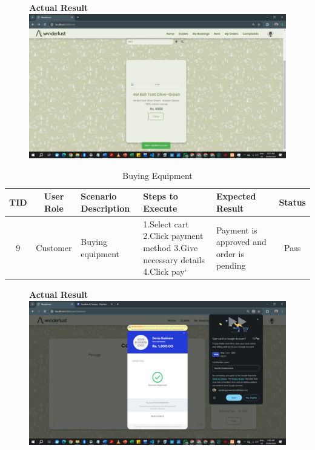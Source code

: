 \begin{figure}[h!]
    \centering
    \textbf{Actual Result}
    \includegraphics[width=1\textwidth]{Images/Test Cases/8. add to cart.png}
\end{figure}
\clearpage

\begin{table}[ht]
\centering
\begin{tabularx}{\textwidth}{|c|c|X|X|X|c|}
\hline
\textbf{TID} & \textbf{User Role} & \textbf{Scenario Description} & \textbf{Steps to Execute} & \textbf{Expected Result} & \textbf{Status} \\ \hline
9 & Customer & Buying equipment & 1.Select cart \newline2.Click payment method \newline3.Give necessary details \newline4.Click pay`& Payment is approved and order is pending & Pass \\ \hline
\end{tabularx}
\caption{Buying Equipment}
\end{table}

\begin{figure}[h!]
    \centering
    \textbf{Actual Result}
    \includegraphics[width=1\textwidth]{Images/Test Cases/9. buy item.png}
\end{figure}
\clearpage

